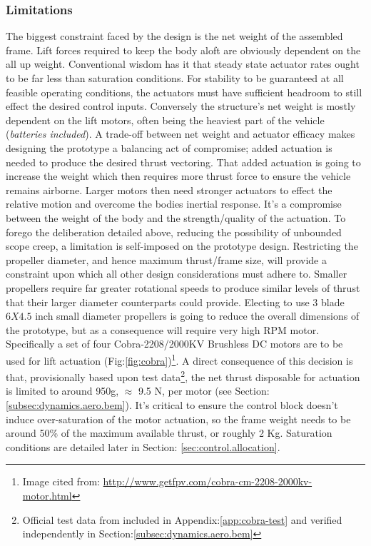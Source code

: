 \subsubsection{Limitations}
\label{subsubsec:intro.foreword.limits}
The biggest constraint faced by the design is the net weight of the assembled frame. Lift forces required to keep the body aloft are obviously dependent on the all up weight. Conventional wisdom has it that steady state actuator rates ought to be far less than saturation conditions. For stability to be guaranteed at all feasible operating conditions, the actuators must have sufficient headroom to still effect the desired control inputs. Conversely the structure's net weight is mostly dependent on the lift motors, often being the heaviest part of the vehicle (\emph{batteries included}). A trade-off between net weight and actuator efficacy makes designing the prototype a balancing act of compromise; added actuation is needed to produce the desired thrust vectoring. That added actuation is going to increase the weight which then requires more thrust force to ensure the vehicle remains airborne. Larger motors then need stronger actuators to effect the relative motion and overcome the bodies inertial response. It's a compromise between the weight of the body and the strength/quality of the actuation.
\newpage
To forego the deliberation detailed above, reducing the possibility of unbounded scope creep, a limitation is self-imposed on the prototype design. Restricting the propeller diameter, and hence maximum thrust/frame size, will provide a constraint upon which all other design considerations must adhere to. Smaller propellers require far greater rotational speeds to produce similar levels of thrust that their larger diameter counterparts could provide. Electing to use 3 blade $6X4.5$ inch small diameter propellers is going to reduce the overall dimensions of the prototype, but as a consequence will require very high RPM motor. Specifically a set of four Cobra-2208/2000KV\cite{cobramotor} Brushless DC motors are to be used for lift actuation (Fig:\ref{fig:cobra})\footnote{Image cited from: \url{http://www.getfpv.com/cobra-cm-2208-2000kv-motor.html}}. A direct consequence of this decision is that, provisionally based upon test data\footnote{Official test data from\cite{cobramotor} included in Appendix:\ref{app:cobra-test} and verified independently in Section:\ref{subsec:dynamics.aero.bem}}, the net thrust disposable for actuation is limited to around 950g, $\approx$ 9.5 N, per motor (see Section:\ref{subsec:dynamics.aero.bem}). It's critical to ensure the control block doesn't induce over-saturation of the motor actuation, so the frame weight needs to be around 50\% of the maximum available thrust, or roughly 2 Kg. Saturation conditions are detailed later in Section: \ref{sec:control.allocation}.
